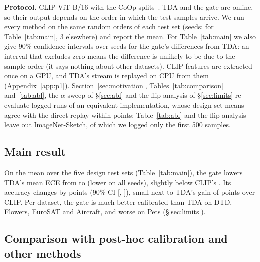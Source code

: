 \documentclass[10pt]{article}
\begin{document}
\textbf{Protocol.} CLIP ViT-B/16 with the CoOp splits~\cite{zhou2022coop}. TDA and the gate are online, so their output
depends on the order in which the test samples arrive. We run every method on the same random orders of each test set
(seeds: \mainSeeds{} for Table~\ref{tab:main}, 3 elsewhere) and report the mean. For Table~\ref{tab:main} we also give
90\% confidence intervals over seeds for the gate's differences from TDA: an interval that excludes zero means the
difference is unlikely to be due to the sample order (it says nothing about other datasets). CLIP features are extracted
once on a GPU, and TDA's stream is replayed on CPU from them (Appendix~\ref{app:p1}). Section~\ref{sec:motivation},
Tables~\ref{tab:comparison} and~\ref{tab:abl}, the $\alpha$ sweep of \S\ref{sec:abl} and the flip analysis of
\S\ref{sec:limits} re-evaluate logged runs of an equivalent implementation, whose design-set means agree with the
direct replay within \replayDiffMax{} points; Table~\ref{tab:abl} and the flip analysis leave out ImageNet-Sketch, of
which we logged only the first 500 samples.

\begin{table}[t]
\centering\small
\caption{Five design test sets, \mainSeeds{} seeds (mean $\pm$ std over sample orders; CLIP does not depend on the
order). Bold: best in each column. Gate $-$ TDA: accuracy \mainDAcc{} [\mainDAccLo, \mainDAccHi], ECE \mainDEce{}
[\mainDEceLo, \mainDEceHi] (90\% CI); ECE lower on \mainDEceWins{} seeds.}
\label{tab:main}

\end{table}

\subsection{Main result}\label{sec:main}
On the mean over the five design test sets (Table~\ref{tab:main}), the gate lowers TDA's mean ECE from \mainTdaEce{} to
\mainGateEce{} (lower on all \mainSeeds{} seeds), slightly below CLIP's \mainClipEce. Its accuracy changes by \mainDAcc{} points (90\% CI
[\mainDAccLo, \mainDAccHi]), small next to TDA's gain of \mainTdaGainAcc{} points over CLIP. Per dataset, the gate is
much better calibrated than TDA on DTD, Flowers, EuroSAT and Aircraft, and worse on Pets (\S\ref{sec:limits}).

\subsection{Comparison with post-hoc calibration and other methods}\label{sec:cmp}
\begin{table}[t]
\centering\small
\caption{Design test sets, 3 seeds, mean of five. $\Delta$: paired difference to TDA; ECE wins: seeds on which the ECE
is below TDA's. TDA + temperature: a single temperature shared by the five datasets, fitted with labels on their
validation splits. ZAEC: our implementation of Eq.~\eqref{eq:zaec} on the same runs. DMN-weak and ECALP: zero-shot, one
view per image.}
\label{tab:comparison}

\end{table}
\end{document}
